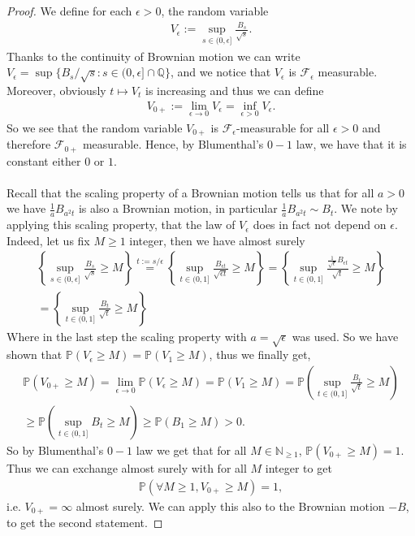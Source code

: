 \documentclass[../mainfile.tex]{subfiles}
\begin{document}
\begin{proof}
We define for each $\epsilon >0$, the random variable 
\begin{align*}
V_\epsilon := \sup_{ s \in (0, \epsilon]} \frac{B_s}{\sqrt{s}}.
\end{align*}
Thanks to the continuity of Brownian motion we can write $V_\epsilon = \sup \{ B_s/\sqrt{s} : s \in (0, \epsilon] \cap \mathbb{Q}\}$, and we notice that $V_\epsilon$ is $\mathcal{F}_\epsilon$ measurable. Moreover, obviously $t \mapsto V_t$ is increasing and thus we can define 
\begin{align*}
V_{0+}:= \lim_{ \epsilon \to 0} V_{\epsilon} = \inf_{ \epsilon >0 } V_\epsilon.
\end{align*}
So we see that the random variable $V_{0+}$ is $\mathcal{F}_\epsilon$-measurable for all $\epsilon >0$ and therefore $\mathcal{F}_{0+}$ measurable. Hence, by Blumenthal's $0-1$ law, we have that it is constant either $0$ or $1$. \\
\\
Recall that the scaling property of a Brownian motion tells us that for all $a>0$ we have $\frac{1}{a}B_{a^2t}$ is also a Brownian motion, in particular $\frac{1}{a}B_{a^2 t} \sim B_t$. We note by applying this scaling property,  that the law of $V_\epsilon$ does in fact not depend on $\epsilon$. Indeed, let us fix $M \geq 1$ integer, then we have almost surely 
\begin{align*}
\left\{ \sup_{s \in (0, \epsilon]} \frac{B_s}{\sqrt{s}} \geq M \right\} \overset{t:=s/\epsilon}= \left\{ \sup_{t \in (0, 1]} \frac{B_{\epsilon t}}{\sqrt{\epsilon t}} \geq M \right\} = \left\{ \sup_{t \in (0,1]} \frac{\frac{1}{\sqrt{\epsilon}} B_{\epsilon t}}{\sqrt{t}} \geq M \right\} \\
= \left\{ \sup_{t \in (0,1]} \frac{B_t}{\sqrt{t}} \geq M \right\}
\end{align*}
Where in the last step the scaling property with $a= \sqrt{\epsilon}$ was used. So we have shown that $\mathbb{P}(V_\epsilon \geq M)= \mathbb{P}(V_1 \geq M)$, thus we finally get, \begin{align*}
\mathbb{P}(V_{0+} \geq M ) = \lim_{ \epsilon \to 0} \mathbb{P}(V_\epsilon \geq M ) = \mathbb{P}(V_1 \geq M )  = \mathbb{P} \left( \sup_{t \in (0,1]} \frac{B_t}{\sqrt{t}} \geq M \right) \\
\geq \mathbb{P}(\sup_{t \in (0,1]} B_t \geq M ) \geq \mathbb{P}( B_1 \geq M ) >0.
\end{align*}
So by Blumenthal's $0-1$ law we get that for all $M \in \mathbb{N}_{ \geq 1}$, $\mathbb{P}(V_{0+} \geq M ) = 1$. Thus we can exchange almost surely with for all $M$ integer to get 
\begin{align*}
\mathbb{P}( \forall M \geq 1, V_{0+} \geq M )=1,
\end{align*}
i.e. $V_{0+} = \infty$ almost surely. We can apply this also to the Brownian motion $-B$, to get the second statement. 
\end{proof}
\newpage
\end{document}
